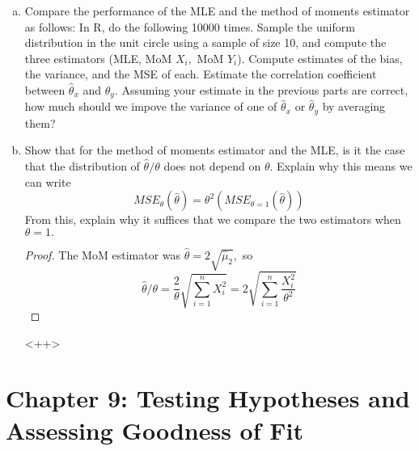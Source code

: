 \documentclass{article}
\begin{document}
\begin{enumerate}
\begin{enumerate}[(a)]
			\item Compare the performance of the MLE and the method of moments estimator as follows: In R, do the following 10000 times. Sample the uniform distribution in the unit circle using a sample of size 10, and compute the three estimators (MLE, MoM $X_i,$ MoM $Y_i$). Compute estimates of the bias, the variance, and the MSE of each. Estimate the correlation coefficient between $\hat{\theta}_x$ and $\hat{\theta}_y.$ Assuming your estimate in the previous parts are correct, how much should we impove the variance of one of $\hat{\theta}_x$ or $\hat{\theta}_y$ by averaging them?

			\item Show that for the method of moments estimator and the MLE, is it the case that the distribution of $\hat{\theta}/\theta$ does not depend on $\theta.$ Explain why this means we can write \[MSE_\theta(\hat{\theta})=\theta^2\left( MSE_{\theta=1}(\hat{\theta}) \right)\] From this, explain why it suffices that we compare the two estimators when $\theta=1.$
				\begin{proof}
					The MoM estimator was $\hat{\theta}=2\sqrt{\hat{\mu}_2},$ so \[\hat{\theta}/\theta = \frac{2}{\theta}\sqrt{\sum_{i=1}^{n} X_i^2} = 2\sqrt{\sum_{i=1}^{n}\frac{X_i^2}{\theta^2}}\]
				\end{proof}<++>
				
		\end{enumerate}
		
\end{enumerate}

\section*{Chapter 9: Testing Hypotheses and Assessing Goodness of Fit}
\end{document}

